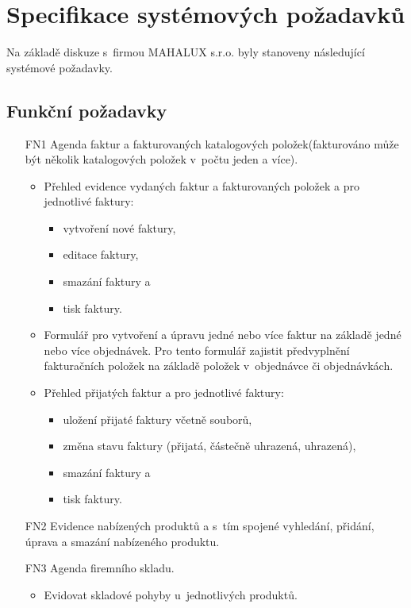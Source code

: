 \documentclass[thesis=B,czech]{FITthesis}[2012/06/26]
\begin{document}
\section{Specifikace systémových požadavků}

	Na základě diskuze s~firmou MAHALUX s.r.o. byly stanoveny následující systémové požadavky.
	
\subsection{Funkční požadavky}

\begin{enumerate}
	\item[FN1] Agenda faktur a fakturovaných katalogových položek(fakturováno může být několik katalogových položek v~počtu jeden a více).
	\begin{itemize}
		\item Přehled evidence vydaných faktur a fakturovaných položek a pro jednotlivé faktury:
		\begin{itemize}
			\item vytvoření nové faktury,
			\item editace faktury,
			\item smazání faktury a
			\item tisk faktury.
		\end{itemize}
		\item Formulář pro vytvoření a úpravu jedné nebo více faktur na základě jedné nebo více objednávek. Pro tento formulář zajistit předvyplnění fakturačních položek na základě položek v~objednávce či objednávkách.
		\item Přehled přijatých faktur a pro jednotlivé faktury:
		\begin{itemize}
			\item uložení přijaté faktury včetně souborů,
			\item změna stavu faktury (přijatá, částečně uhrazená, uhrazená),
			\item smazání faktury a
			\item tisk faktury.
		\end{itemize}
	\end{itemize}	
	\item[FN2] Evidence nabízených produktů a s~tím spojené
	 	vyhledání, přidání, úprava a smazání nabízeného produktu.
	\newpage
	\item[FN3] Agenda firemního skladu.
		\begin{itemize}
			\item Evidovat skladové pohyby u~jednotlivých produktů.

\end{itemize}
\end{enumerate}
\end{document}
